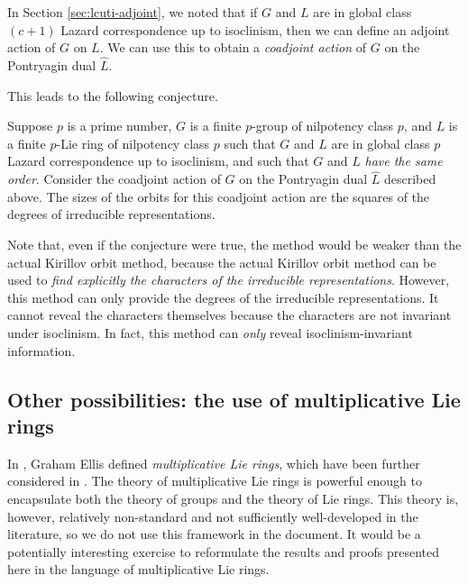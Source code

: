 In Section \ref{sec:lcuti-adjoint}, we noted that if $G$ and $L$ are
in global class $(c + 1)$ Lazard correspondence up to isoclinism, then
we can define an adjoint action of $G$ on $L$. We can use this to
obtain a {\em coadjoint action} of $G$ on the Pontryagin dual
$\hat{L}$.

This leads to the following conjecture.

\begin{conjecture}
  Suppose $p$ is a prime number, $G$ is a finite $p$-group of
  nilpotency class $p$, and $L$ is a finite $p$-Lie ring of nilpotency
  class $p$ such that $G$ and $L$ are in global class $p$ Lazard
  correspondence up to isoclinism, and such that $G$ and $L$ {\em have
    the same order}. Consider the coadjoint action of $G$ on the
  Pontryagin dual $\hat{L}$ described above. The sizes of the orbits
  for this coadjoint action are the squares of the degrees of
  irreducible representations.
\end{conjecture}

Note that, even if the conjecture were true, the method would be
weaker than the actual Kirillov orbit method, because the actual
Kirillov orbit method can be used to {\em find explicitly the
  characters of the irreducible representations}. However, this method
can only provide the degrees of the irreducible representations. It
cannot reveal the characters themselves because the characters are not
invariant under isoclinism. In fact, this method can {\em only} reveal
isoclinism-invariant information.
\subsection{Other possibilities: the use of multiplicative Lie rings}

In \cite{Ellis93}, Graham Ellis defined {\em multiplicative Lie
  rings}, which have been further considered in
\cite{homologyofmultiplicativeLierings}. The theory of multiplicative
Lie rings is powerful enough to encapsulate both the theory of groups
and the theory of Lie rings. This theory is, however, relatively
non-standard and not sufficiently well-developed in the literature, so
we do not use this framework in the document. It would be a
potentially interesting exercise to reformulate the results and proofs
presented here in the language of multiplicative Lie rings.


